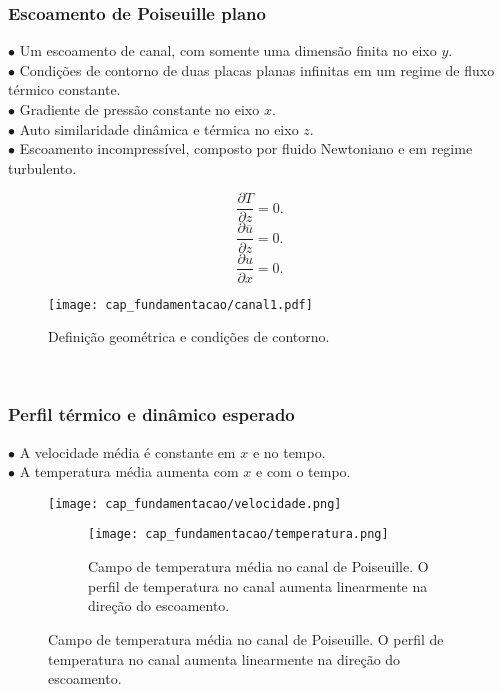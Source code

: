 \documentclass[xcolor=dvipsnames,10pt,aspectratio=169]{beamer}
\begin{document}
		\begin{frame}
			\frametitle{Escoamento de Poiseuille plano}
			$\bullet$ Um escoamento de canal, com somente uma dimensão finita no eixo $y$. \\
			$\bullet$ Condições de contorno de duas placas planas infinitas em um regime de fluxo térmico constante.\\
			$\bullet$ Gradiente de pressão constante no eixo $x$.\\
			$\bullet$ Auto similaridade dinâmica e térmica no eixo $z$. \\
			$\bullet$ Escoamento incompressível, composto por fluido Newtoniano e em regime turbulento.\\
			\begin{minipage}[h!]{0.3\textwidth}
				\begin{equation*}
				 \frac{\partial T }{\partial z} = 0.
				\end{equation*}
				\begin{equation*}
				\frac{\partial \overline{u} }{\partial z} = 0.
				\end{equation*}
				\begin{equation*}
				\frac{\partial u }{\partial x} = 0.
				\end{equation*}
      \end{minipage}
      \begin{minipage}[h!]{0.5\textwidth}
        \begin{figure}[h!]
          \centering
          \texttt{[image: cap\_fundamentacao/canal1.pdf]}
          \caption{Definição geométrica e condições de contorno.}
          \label{descricaoGeometrica}
        \end{figure}
			\end{minipage}
			\\
		\end{frame}

		\begin{frame}
			\frametitle{Perfil térmico e dinâmico esperado}
      $\bullet$ A velocidade média é constante em $x$ e no tempo.\\
      $\bullet$ A temperatura média aumenta com $x$ e com o tempo.\\
      \begin{figure}[h!]
        \centering
        \texttt{[image: cap\_fundamentacao/velocidade.png]}
        \caption{Campo de velocidade média no canal de Poiseuille. O perfil se mantém constante na direção do escoamento.}
        \label{figure.3}
      \begin{figure}[h!]
        \centering
        \texttt{[image: cap\_fundamentacao/temperatura.png]}
        \caption{Campo de temperatura média no canal de Poiseuille. O perfil de temperatura no canal aumenta linearmente na direção do escoamento.}
        \label{figure.2}
      \end{figure}
      \end{figure}
		\end{frame}
	
\end{document}
